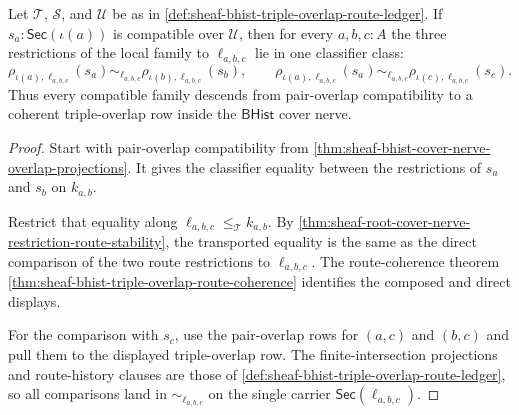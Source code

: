 \begin{theorem}
\label{thm:sheaf-bhist-triple-overlap-compatible-family-descent}
Let $\mathcal{T}$, $\mathcal{S}$, and $\mathcal{U}$ be as in \autoref{def:sheaf-bhist-triple-overlap-route-ledger}. If $s_a:\mathsf{Sec}(\iota(a))$ is compatible over $\mathcal{U}$, then for every $a,b,c:A$ the three restrictions of the local family to $\ell_{a,b,c}$ lie in one classifier class:
$$
\rho_{\iota(a),\ell_{a,b,c}}(s_a)
\sim_{\ell_{a,b,c}}
\rho_{\iota(b),\ell_{a,b,c}}(s_b),
\qquad
\rho_{\iota(a),\ell_{a,b,c}}(s_a)
\sim_{\ell_{a,b,c}}
\rho_{\iota(c),\ell_{a,b,c}}(s_c).
$$
Thus every compatible family descends from pair-overlap compatibility to a coherent triple-overlap row inside the $\mathsf{BHist}$ cover nerve.
\end{theorem}
\begin{proof}
Start with pair-overlap compatibility from \autoref{thm:sheaf-bhist-cover-nerve-overlap-projections}. It gives the classifier equality between the restrictions of $s_a$ and $s_b$ on $k_{a,b}$.

Restrict that equality along $\ell_{a,b,c}\le_{\mathcal{T}}k_{a,b}$. By \autoref{thm:sheaf-root-cover-nerve-restriction-route-stability}, the transported equality is the same as the direct comparison of the two route restrictions to $\ell_{a,b,c}$. The route-coherence theorem \autoref{thm:sheaf-bhist-triple-overlap-route-coherence} identifies the composed and direct displays.

For the comparison with $s_c$, use the pair-overlap rows for $(a,c)$ and $(b,c)$ and pull them to the displayed triple-overlap row. The finite-intersection projections and route-history clauses are those of \autoref{def:sheaf-bhist-triple-overlap-route-ledger}, so all comparisons land in $\sim_{\ell_{a,b,c}}$ on the single carrier $\mathsf{Sec}(\ell_{a,b,c})$.
\end{proof}

